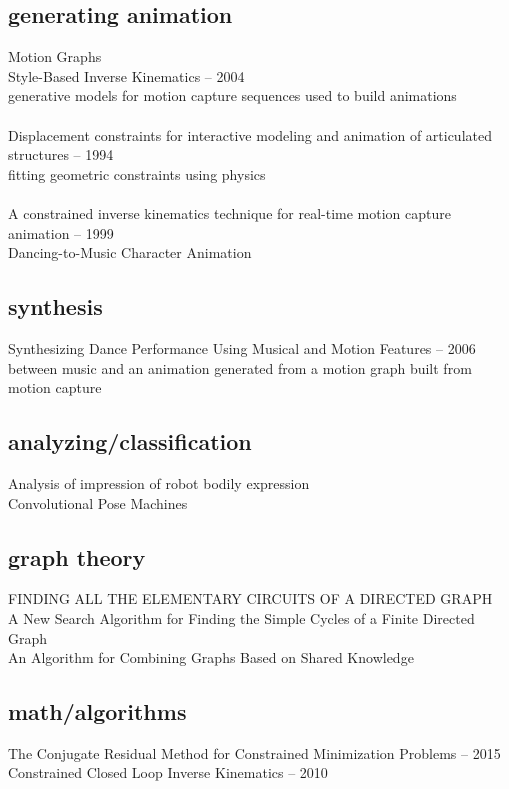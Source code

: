 \documentclass[12pt, a4paper]{memoir}
\begin{document}
\subsection{generating animation}
Motion Graphs\\
Style-Based Inverse Kinematics -- 2004\\
generative models for motion capture sequences used to build animations\\\\
Displacement constraints for interactive modeling and animation of articulated structures -- 1994\\
fitting geometric constraints using physics\\\\
A constrained inverse kinematics technique for real-time motion capture animation -- 1999\\
Dancing-to-Music Character Animation

\subsection{synthesis}
Synthesizing Dance Performance Using Musical and Motion Features -- 2006\\
between music and an animation generated from a motion graph built from motion capture

\subsection{analyzing/classification}
Analysis of impression of robot bodily expression\\
Convolutional Pose Machines

\subsection{graph theory}
FINDING ALL THE ELEMENTARY CIRCUITS OF A DIRECTED GRAPH\\
A New Search Algorithm for Finding the Simple Cycles of a Finite Directed Graph\\
An Algorithm for Combining Graphs Based on Shared Knowledge

\subsection{math/algorithms}
The Conjugate Residual Method for Constrained Minimization Problems -- 2015\\
Constrained Closed Loop Inverse Kinematics -- 2010
\end{document}
